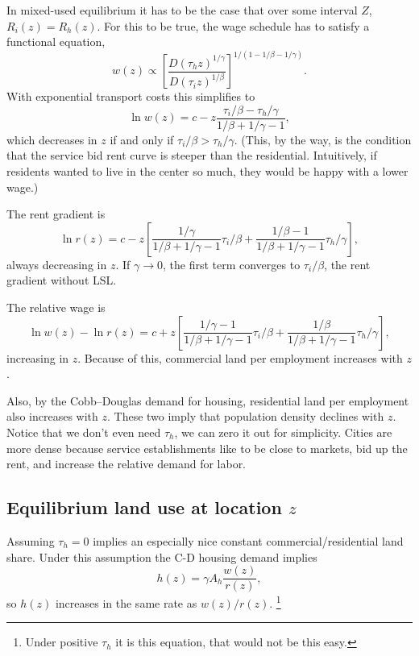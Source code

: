 \documentclass[10pt]{article}
\begin{document}
In mixed-used equilibrium it has to be the case that over some interval $Z$, $R_i(z)=R_h(z)$. For this to be true, the wage schedule has to satisfy a functional equation,
\[
w(z) \propto \left[\frac{D(\tau_hz)^{1/\gamma}}{D(\tau_iz)^{1/\beta}}\right]^{1/(1-1/\beta-1/\gamma)}.
\]
With exponential transport costs this simplifies to
\[
\ln w(z) = c - z\frac{\tau_i/\beta-\tau_h/\gamma}{1/\beta+1/\gamma-1},
\]
which decreases in $z$ if and only if $\tau_i/\beta > \tau_h/\gamma$. (This, by the way, is the condition that the service bid rent curve is steeper than the residential. Intuitively, if residents wanted to live in the center so much, they would be happy with a lower wage.)

The rent gradient is
\[
\ln r(z) = c - z\left[\frac{1/\gamma}{1/\beta+1/\gamma-1}\tau_i/\beta+
\frac{1/\beta-1}{1/\beta+1/\gamma-1}\tau_h/\gamma\right],
\]
always decreasing in $z$. If $\gamma\to 0$, the first term converges to $\tau_i/\beta$, the rent gradient without LSL.

The relative wage is
\[
\ln w(z) - \ln r(z) = c + z\left[\frac{1/\gamma-1}{1/\beta+1/\gamma-1}\tau_i/\beta+
\frac{1/\beta}{1/\beta+1/\gamma-1}\tau_h/\gamma\right],
\]
increasing in $z$. Because of this, commercial land per employment increases with $z$.

Also, by the Cobb--Douglas demand for housing, residential land per employment also increases with $z$. These two imply that population density declines with $z$. Notice that we don't even need $\tau_h$, we can zero it out for simplicity. Cities are more dense because service establishments like to be close to markets, bid up the rent, and increase the relative demand for labor.

\subsection{Equilibrium land use at location $z$}
Assuming $\tau_h=0$ implies an especially nice constant commercial/residential land share. Under this assumption the C-D housing demand implies
\begin{equation*}
h(z)=\gamma A_h\frac{w(z)}{r(z)},
\end{equation*}
so $h(z)$ increases in the same rate as $w(z)/r(z)$. \footnote{Under positive $\tau_h$ it is this equation, that would not be this easy.}
\end{document}
